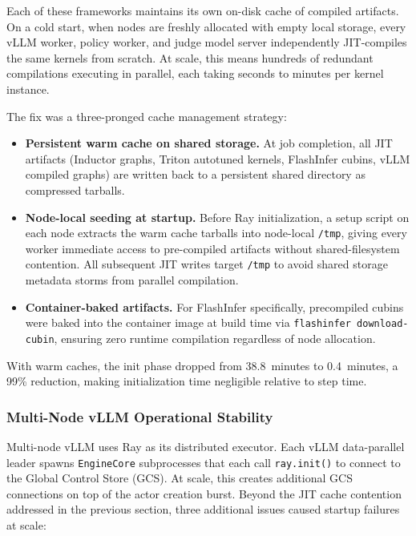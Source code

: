 Each of these frameworks maintains its own on-disk cache of compiled artifacts. On a cold 
start, when nodes are freshly allocated with empty local storage, every vLLM worker, 
policy worker, and judge model server independently JIT-compiles the same kernels from 
scratch. At scale, this means hundreds of redundant compilations 
executing in parallel, each taking seconds to minutes per kernel instance.

The fix was a three-pronged cache management strategy:

\begin{itemize}
  \item \textbf{Persistent warm cache on shared storage.} At job completion, all JIT 
    artifacts (Inductor graphs, Triton autotuned kernels, FlashInfer cubins, vLLM compiled 
    graphs) are written back to a persistent shared directory as compressed tarballs.

  \item \textbf{Node-local seeding at startup.} Before Ray initialization, a setup script 
    on each node extracts the warm cache tarballs into node-local \texttt{/tmp}, giving every 
    worker immediate access to pre-compiled artifacts without shared-filesystem contention. 
    All subsequent JIT writes target \texttt{/tmp} to avoid shared storage metadata storms from 
    parallel compilation.

  \item \textbf{Container-baked artifacts.} For FlashInfer specifically, precompiled cubins 
    were baked into the container image at build time via \texttt{flashinfer download-cubin}, 
    ensuring zero runtime compilation regardless of node allocation.
\end{itemize}

\noindent With warm caches, the init phase dropped from 38.8~minutes to 0.4~minutes, a 
99\% reduction, making initialization time negligible relative to step time.

\subsubsection*{Multi-Node vLLM Operational Stability}

Multi-node vLLM uses Ray as its distributed executor. Each vLLM data-parallel leader spawns 
\texttt{EngineCore} subprocesses that each call \texttt{ray.init()} to connect to the Global 
Control Store (GCS). At scale, this creates additional GCS connections on top of the actor 
creation burst. Beyond the JIT cache contention addressed in the previous section, three 
additional issues caused startup failures at scale:


